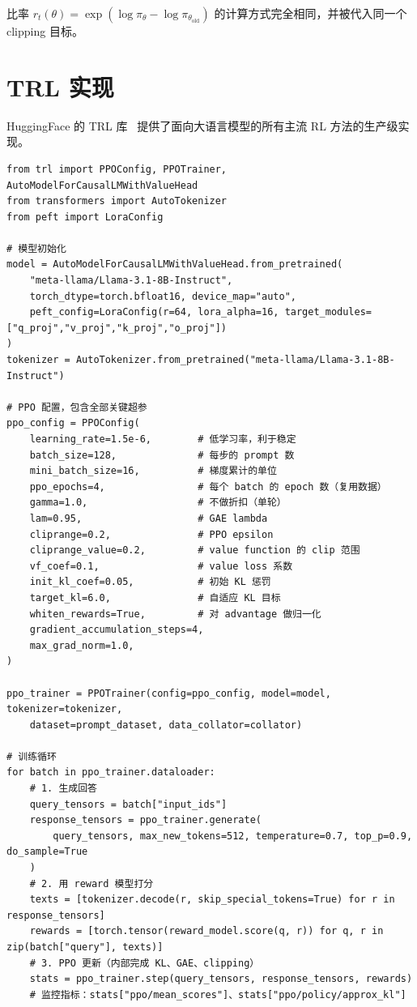比率 $r_t(\theta) = \exp(\log \pi_\theta - \log \pi_{\theta_{\text{old}}})$ 的计算方式完全相同，并被代入同一个 clipping 目标。

\section{TRL 实现}
\label{trl-implementation}

HuggingFace 的 TRL 库~\cite{vonwerra2022trl} 提供了面向大语言模型的所有主流 RL 方法的生产级实现。

\begin{lstlisting}[style=pythonstyle]
from trl import PPOConfig, PPOTrainer, AutoModelForCausalLMWithValueHead
from transformers import AutoTokenizer
from peft import LoraConfig

# 模型初始化
model = AutoModelForCausalLMWithValueHead.from_pretrained(
    "meta-llama/Llama-3.1-8B-Instruct",
    torch_dtype=torch.bfloat16, device_map="auto",
    peft_config=LoraConfig(r=64, lora_alpha=16, target_modules=["q_proj","v_proj","k_proj","o_proj"])
)
tokenizer = AutoTokenizer.from_pretrained("meta-llama/Llama-3.1-8B-Instruct")

# PPO 配置，包含全部关键超参
ppo_config = PPOConfig(
    learning_rate=1.5e-6,        # 低学习率，利于稳定
    batch_size=128,              # 每步的 prompt 数
    mini_batch_size=16,          # 梯度累计的单位
    ppo_epochs=4,                # 每个 batch 的 epoch 数（复用数据）
    gamma=1.0,                   # 不做折扣（单轮）
    lam=0.95,                    # GAE lambda
    cliprange=0.2,               # PPO epsilon
    cliprange_value=0.2,         # value function 的 clip 范围
    vf_coef=0.1,                 # value loss 系数
    init_kl_coef=0.05,           # 初始 KL 惩罚
    target_kl=6.0,               # 自适应 KL 目标
    whiten_rewards=True,         # 对 advantage 做归一化
    gradient_accumulation_steps=4,
    max_grad_norm=1.0,
)

ppo_trainer = PPOTrainer(config=ppo_config, model=model, tokenizer=tokenizer,
    dataset=prompt_dataset, data_collator=collator)

# 训练循环
for batch in ppo_trainer.dataloader:
    # 1. 生成回答
    query_tensors = batch["input_ids"]
    response_tensors = ppo_trainer.generate(
        query_tensors, max_new_tokens=512, temperature=0.7, top_p=0.9, do_sample=True
    )
    # 2. 用 reward 模型打分
    texts = [tokenizer.decode(r, skip_special_tokens=True) for r in response_tensors]
    rewards = [torch.tensor(reward_model.score(q, r)) for q, r in zip(batch["query"], texts)]
    # 3. PPO 更新（内部完成 KL、GAE、clipping）
    stats = ppo_trainer.step(query_tensors, response_tensors, rewards)
    # 监控指标：stats["ppo/mean_scores"]、stats["ppo/policy/approx_kl"]
\end{lstlisting}

